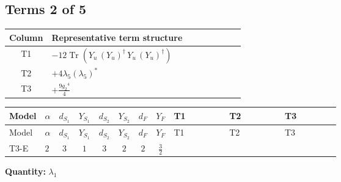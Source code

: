 \documentclass[8pt]{article}
\begin{document}
\begin{landscape}
\subsection*{Terms 2 of 5}
\begin{center}
\begin{tabular}{@{}c >{\raggedright\arraybackslash}p{0.82\linewidth}@{}}
\toprule
Column & Representative term structure \\
\midrule
T1 & \(\displaystyle -12 \operatorname{Tr}\!\left({Y_u}\,\left({Y_u}\right)^{\dagger}\,{Y_u}\,\left({Y_u}\right)^{\dagger}\right)\) \\
\midrule
T2 & \(\displaystyle +4 {\lambda_5} \left({\lambda_5}\right)^{*}\) \\
\midrule
T3 & \(\displaystyle +\frac{9 {g_2}^4}{4}\) \\
\midrule
\bottomrule
\end{tabular}
\end{center}
\smallskip
\tiny
\begin{longtable}{@{}llcccccc >{\raggedright\arraybackslash}p{0.21\linewidth} >{\raggedright\arraybackslash}p{0.21\linewidth} >{\raggedright\arraybackslash}p{0.21\linewidth}@{}}
\toprule
Model & $\alpha$ & $d_{S_1}$ & $Y_{S_1}$ & $d_{S_2}$ & $Y_{S_2}$ & $d_F$ & $Y_F$ & T1 & T2 & T3 \\
\midrule
\endfirsthead
\toprule
Model & $\alpha$ & $d_{S_1}$ & $Y_{S_1}$ & $d_{S_2}$ & $Y_{S_2}$ & $d_F$ & $Y_F$ & T1 & T2 & T3 \\
\midrule
\endhead
T3-E & $2$ & $3$ & $1$ & $3$ & $2$ & $2$ & $\frac{3}{2}$ & \scriptsize\adjustbox{max width=\linewidth}{$\begin{gathered} -12 \operatorname{Tr}\!\left({Y_u}\,\left({Y_u}\right)^{\dagger}\,{Y_u}\,\left({Y_u}\right)^{\dagger}\right)\end{gathered}$} & \scriptsize\adjustbox{max width=\linewidth}{$\begin{gathered} +4 {\lambda_5} \left({\lambda_5}\right)^{*}\end{gathered}$} & \scriptsize\adjustbox{max width=\linewidth}{$\begin{gathered} +\frac{9 {g_2}^4}{4}\end{gathered}$} \\
\midrule
\bottomrule
\end{longtable}
\clearpage
\noindent\textbf{Quantity: }$\lambda_1$\par\smallskip

\end{landscape}
\end{document}
